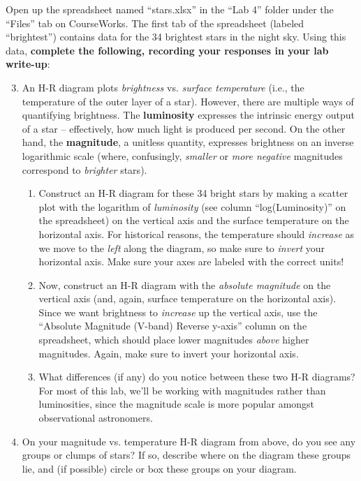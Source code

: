 \documentclass[11pt]{article}
\begin{document}
Open up the spreadsheet named ``stars.xlsx'' in the ``Lab 4'' folder under the ``Files'' tab on CourseWorks. The first tab of the spreadsheet (labeled ``brightest'') contains data for the 34 brightest stars in the night sky. Using this data, \textbf{complete the following, recording your responses in your lab write-up}:
\begin{enumerate}
    \setcounter{enumi}{2}
    
    \item An H-R diagram plots \emph{brightness} vs. \emph{surface temperature} (i.e., the temperature of the outer layer of a star). However, there are multiple ways of quantifying brightness. The \textbf{luminosity} expresses the intrinsic energy output of a star -- effectively, how much light is produced per second. On the other hand, the \textbf{magnitude}, a unitless quantity, expresses brightness on an inverse logarithmic scale (where, confusingly, \emph{smaller} or \emph{more negative} magnitudes correspond to \emph{brighter} stars).
    \begin{enumerate}
        \item Construct an H-R diagram for these 34 bright stars by making a scatter plot with the logarithm of \emph{luminosity} (see column ``log(Luminosity)'' on the spreadsheet) on the vertical axis and the surface temperature on the horizontal axis. For historical reasons, the temperature should \emph{increase} as we move to the \emph{left} along the diagram, so make sure to \emph{invert} your horizontal axis. Make sure your axes are labeled with the correct units!
        
        \item Now, construct an H-R diagram with the \emph{absolute magnitude} on the vertical axis (and, again, surface temperature on the horizontal axis). Since we want brightness to \emph{increase} up the vertical axis, use the ``Absolute Magnitude (V-band) Reverse y-axis'' column on the spreadsheet, which should place lower magnitudes \emph{above} higher magnitudes. Again, make sure to invert your horizontal axis.
        
        \item What differences (if any) do you notice between these two H-R diagrams? For most of this lab, we'll be working with magnitudes rather than luminosities, since the magnitude scale is more popular amongst observational astronomers.
    \end{enumerate}
    
    \item On your magnitude vs. temperature H-R diagram from above, do you see any groups or clumps of stars? If so, describe where on the diagram these groups lie, and (if possible) circle or box these groups on your diagram.
    

\end{enumerate}
\end{document}
